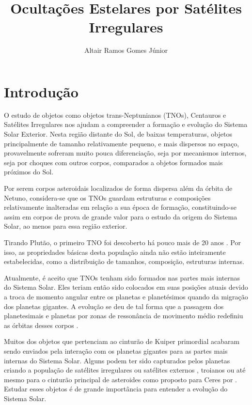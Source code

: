 \documentclass[12pt,a4paper]{report}
\author{Altair Ramos Gomes Júnior}
\title{Ocultações Estelares por Satélites Irregulares}
\begin{document}
\maketitle

\pagestyle{headings}

\section{Introdução} \label{Chap:Intro}

\indent \indent O estudo de objetos como objetos trans-Neptunianos (TNOs), Centauros e Satélites Irregulares nos ajudam a compreender a formação e evolução do Sistema Solar Exterior. Nesta região distante do Sol, de baixas temperaturas, objetos principalmente de tamanho relativamente pequeno, e mais dispersos no espaço, provavelmente sofreram muito pouca diferenciação, seja por mecanismos internos, seja por choques com outros corpos, comparados a objetos formados mais próximos do Sol.

Por serem corpos asteroidais localizados de forma dispersa além da órbita de Netuno, considera-se que os TNOs guardam estruturas e composições relativamente inalteradas em relação a sua época de formação, constituindo-se assim em corpos de prova de grande valor para o estudo da origem do Sistema Solar, ao menos para essa região exterior.

Tirando Plutão, o primeiro TNO foi descoberto há pouco mais de 20 anos \citep{Jewitt1993}. Por isso, as propriedades básicas desta população ainda não estão inteiramente estabelecidas, como a distribuição de tamanhos, composição, estruturas internas.

Atualmente, é aceito que TNOs tenham sido formados nas partes mais internas do Sistema Solar. Eles teriam então sido colocados em suas posições atuais devido a troca de momento angular entre os planetas e planetésimos quando da migração dos planetas gigantes. A evolução se deu de tal forma que a passagem dos planetesimais e planetas por zonas de ressonância de movimento médio redefiniu as órbitas desses corpos \citep{Tsiganis2005}.

Muitos dos objetos que pertenciam ao cinturão de Kuiper primordial acabaram sendo enviados pela interação com os planetas gigantes para as partes mais internas do Sistema Solar. Alguns podem ter sido capturados pelos planetas criando a população de satélites irregulares ou satélites externos \citep{Nesvorny2007}, troianos \citep{Morbidelli2005} ou até mesmo para o cinturão principal de asteroides como proposto para Ceres por \cite{McKinnon2012}. Estudar esses objetos é de grande importância para entender a evolução do Sistema Solar.
\end{document}
